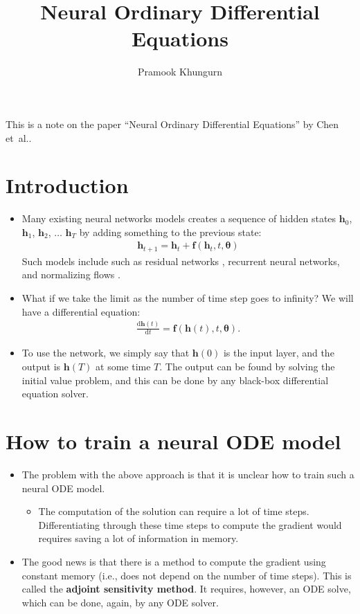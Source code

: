 \documentclass[10pt]{article}
\title{Neural Ordinary Differential Equations}
\author{Pramook Khungurn}
\newcommand{\dee}{\mathrm{d}}
\newcommand{\ve}[1]{\mathbf{#1}}
\newcommand{\ves}[1]{\boldsymbol{#1}}
\newcommand{\etal}{{et~al.}}
\begin{document}
\maketitle

This is a note on the paper ``Neural Ordinary Differential Equations'' by Chen \etal \cite{Chen:2018}.

\section{Introduction}

\begin{itemize}
  \item Many existing neural networks models creates a sequence of hidden states $\ve{h}_0$, $\ve{h}_1$, $\ve{h}_2$, $\dotsc$ $\ve{h}_T$ by adding something to the previous state:
  \begin{align*}
    \ve{h}_{t+1} = \ve{h}_t + \ve{f}(\ve{h}_t, t, \ves{\theta})
  \end{align*}
  Such models include such as residual networks \cite{He:2015}, recurrent neural networks, and normalizing flows \cite{Rezende:2015,Dinh:2014}.

  \item What if we take the limit as the number of time step goes to infinity? We will have a differential equation:
  \begin{align*}
    \frac{\dee\ve{h}(t)}{\dee t} = \ve{f}(\ve{h}(t), t, \ves{\theta}).
  \end{align*}

  \item To use the network, we simply say that $\ve{h}(0)$ is the input layer, and the output is $\ve{h}(T)$ at some time $T$. The output can be found by solving the initial value problem, and this can be done by any black-box differential equation solver. 
\end{itemize}

\section{How to train a neural ODE model}

\begin{itemize}
  \item The problem with the above approach is that it is unclear how to train such a neural ODE model.
  \begin{itemize}
    \item The computation of the solution can require a lot of time steps. Differentiating through these time steps to compute the gradient would requires saving a lot of information in memory.
  \end{itemize}

  \item The good news is that there is a method to compute the gradient using constant memory (i.e., does not depend on the number of time steps). This is called the {\bf adjoint sensitivity method}. It requires, however, an ODE solve, which can be done, again, by any ODE solver.
\end{itemize}  
  
\end{document}
